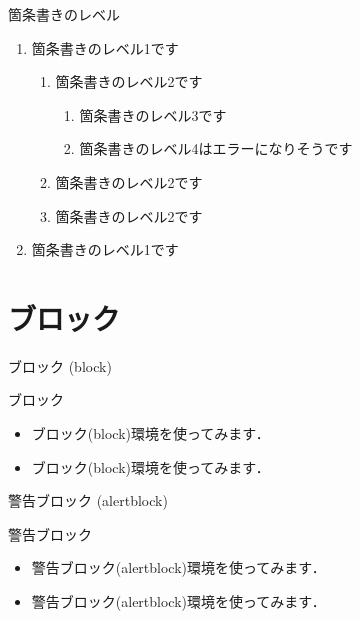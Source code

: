 \begin{frame}{箇条書きのレベル}
  \begin{enumerate}
    \item 箇条書きのレベル1です
    \begin{enumerate}
      \item 箇条書きのレベル2です
      \begin{enumerate}
        \item 箇条書きのレベル3です
        \item 箇条書きのレベル4はエラーになりそうです
      \end{enumerate}
      \item 箇条書きのレベル2です
      \item 箇条書きのレベル2です
    \end{enumerate}
    \item 箇条書きのレベル1です
  \end{enumerate}
\end{frame}


\section{ブロック}

\begin{frame}{ブロック (block)}
  \begin{block}{ブロック}
    \begin{itemize}
      \item ブロック(block)環境を使ってみます．
      \item ブロック(block)環境を使ってみます．
    \end{itemize}
  \end{block}
\end{frame}

\begin{frame}{警告ブロック (alertblock)}
  \begin{alertblock}{警告ブロック}
    \begin{itemize}
      \item 警告ブロック(alertblock)環境を使ってみます．
      \item 警告ブロック(alertblock)環境を使ってみます．
    \end{itemize}
  \end{alertblock}
\end{frame}

